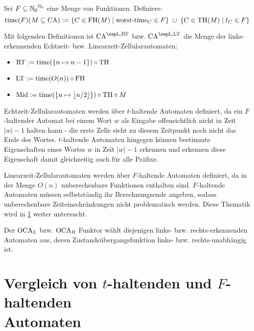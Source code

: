 \begin{definition}
    \label{def:ZeitFunktoren}
    Sei $F \subseteq {\mathbb{N}_0}^{\mathbb{N}_0}$ eine Menge von Funktionen. Definiere:
    \[
        \mathrm{time}(F)(M \subseteq \textrm{CA}) := \{ { C \in \textrm{FH}(M) } \; | \; { \operatorname{worst-time}_C \in F } \} \; \cup \; \{ { C \in \textrm{TH}(M) } \; | \; { t_C \in F } \}
    \]
    
    Mit folgenden Definitionen ist $\CAM{\CALeft, \CART}$ \acs{bzw.} $\CAM{\CALeft, \CALT}$ die Menge der links-erkennenden Echtzeit- \acs{bzw.} Linearzeit-Zellularautomaten:

    \begin{itemize}
        \item $\mathrm{\textrm{RT}} := \mathrm{time}(\{ {n \mapsto n - 1} \}) \circ \textrm{TH}$
        \item $\mathrm{\textrm{LT}} := \mathrm{time}(O(n)) \circ \textrm{FH}$
        \item $\mathrm{Mid} := \mathrm{time}(\{ {n \mapsto \lfloor n/2 \rfloor} \}) \circ \textrm{TH} \circ M $
    \end{itemize}   
\end{definition}

Echtzeit-Zellularautomaten werden über $t$-haltende Automaten definiert, da ein
$F$-haltender Automat bei einem Wort $w$ als Eingabe offensichtlich nicht in Zeit $|w|-1$ halten kann -
die erste Zelle sieht zu diesem Zeitpunkt noch nicht das Ende des Wortes.
$t$-haltende Automaten hingegen können bestimmte Eigenschaften eines Wortes $w$ in Zeit $|w|-1$ erkennen
und erkennen diese Eigenschaft damit gleichzeitig auch für alle Präfixe.

Linearzeit-Zellularautomaten werden über $F$-haltende Automaten definiert,
da in der Menge $O(n)$ unberechenbare Funktionen enthalten sind.
$F$-haltende Automaten müssen selbstständig ihr Berechnungsende angeben, sodass
unberechenbare Zeiteinschränkungen nicht problematisch werden.
Diese Thematik wird in \cref{sec:Vergleich_t_haltend_F_haltend} weiter untersucht.

\begin{definition}
    Der $\operatorname{OCA}_L$ \acs{bzw.} $\operatorname{OCA}_R$ Funktor wählt diejenigen links- \acs{bzw.} rechts-erkennenden Automaten aus, deren Zustandsübergangsfunktion links- \acs{bzw.} rechts-unabhängig ist.
\end{definition}

\section[Vergleich von \texorpdfstring{$t$}{t}-haltenden und \texorpdfstring{$F$}{F}-haltenden Automaten]{Vergleich von $t$-haltenden und $F$-haltenden\\ Automaten}
\label{sec:Vergleich_t_haltend_F_haltend}

